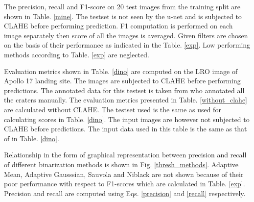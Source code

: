 \documentclass[11pt]{article}
\begin{document}
The precision, recall and F1-score on 20 test images from the training split are shown in Table. \ref{mine}. The testset is not seen by the u-net and is subjected to CLAHE before performing prediction. F1 computation is performed on each image separately then score of all the images is averaged. Given filters are chosen on the basis of their performance as indicated in the Table. \ref{exp}. Low performing methods according to Table. \ref{exp} are neglected. 

Evaluation metrics shown in Table. \ref{dino} are computed on the LRO image of Apollo 17 landing site. The images are subjected to CLAHE before performing predictions. The annotated data for this testset is taken from \cite{dino2020} who annotated all the craters manually. The evaluation metrics presented in Table. \ref{without_clahe} are calculated without CLAHE. The testset used is the same as used for calculating scores in Table. \ref{dino}. The input images are however not subjected to CLAHE before predictions. The input data used in this table is the same as that of in Table. \ref{dino}.

Relationship in the form of graphical representation between precision and recall of different binarization methods is shown in Fig. \ref{thresh_methods}. Adaptive Mean, Adaptive Gausssian, Sauvola and Niblack are not shown because of their poor performance with respect to F1-scores which are calculated in Table. \ref{exp}. Precision and recall are computed using Eqs. \ref{precision} and \ref{recall} respectively.
\end{document}
